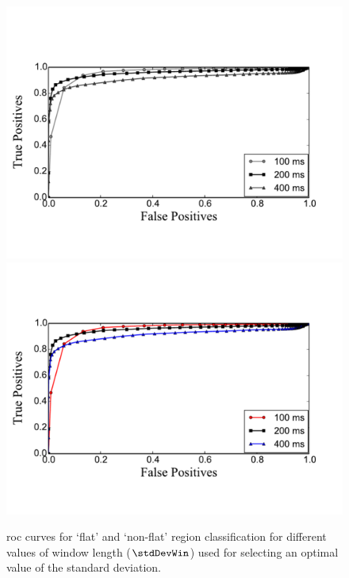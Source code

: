 \begin{figure}
	\begin{center}
		\ifdefined\PRINTVER
			\includegraphics[width=\figSizeSeventy]{ch06_patterns/figures/discovery/ROCFlatness_BW.pdf}
		\else
			\includegraphics[width=\figSizeSeventy]{ch06_patterns/figures/discovery/ROCFlatness.pdf}
		\fi
	\end{center}
	\caption[\acrshort{roc} curve for `flat' and `non-flat' region classification]{\acrshort{roc} curves for `flat' and `non-flat' region classification for different values of window length ($\stdDevWin$) used for selecting an optimal value of the standard deviation.}
	\label{fig:ROC_pattern_discovery}
\end{figure}

